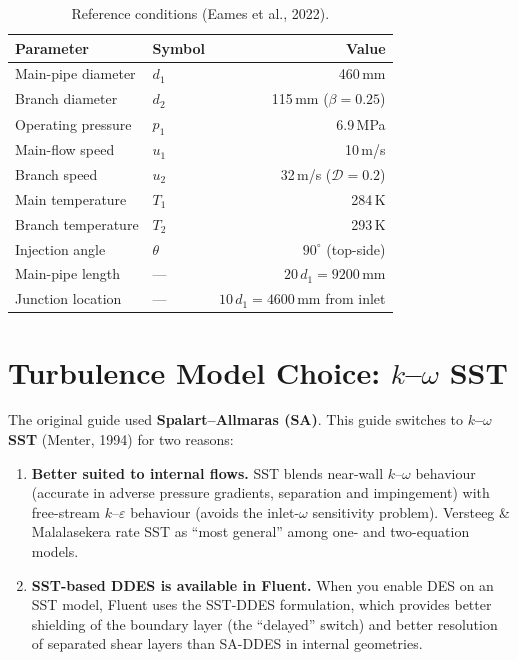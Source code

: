 \documentclass[12pt,a4paper]{report}
\begin{document}
\begin{table}[H]
\centering
\caption{Reference conditions (Eames et al., 2022).}
\label{tab:refcond}
\begin{tabular}{@{}llr@{}}
\toprule
\textbf{Parameter} & \textbf{Symbol} & \textbf{Value} \\
\midrule
Main-pipe diameter   & $d_1$           & 460\,mm \\
Branch diameter      & $d_2$           & 115\,mm ($\beta = 0.25$) \\
Operating pressure   & $p_1$           & 6.9\,MPa \\
Main-flow speed      & $u_1$           & 10\,m/s \\
Branch speed         & $u_2$           & 32\,m/s ($\mathcal{D} = 0.2$) \\
Main temperature     & $T_1$           & 284\,K \\
Branch temperature   & $T_2$           & 293\,K \\
Injection angle      & $\theta$        & $90^{\circ}$ (top-side) \\
Main-pipe length     & ---             & $20\,d_1 = 9200$\,mm \\
Junction location    & ---             & $10\,d_1 = 4600$\,mm from inlet \\
\bottomrule
\end{tabular}
\end{table}


\section{Turbulence Model Choice: $k$--$\omega$ SST}
\label{sec:whysst}

The original guide used \textbf{Spalart--Allmaras (SA)}.  This guide
switches to \textbf{$k$--$\omega$ SST} (Menter, 1994) for two
reasons:

\begin{enumerate}
  \item \textbf{Better suited to internal flows.}  SST blends near-wall
        $k$--$\omega$ behaviour (accurate in adverse pressure gradients,
        separation and impingement) with free-stream $k$--$\varepsilon$
        behaviour (avoids the inlet-$\omega$ sensitivity problem).
        Versteeg \& Malalasekera rate SST as ``most general'' among
        one- and two-equation models.
  \item \textbf{SST-based DDES is available in Fluent.}  When you
        enable DES on an SST model, Fluent uses the SST-DDES
        formulation, which provides better shielding of the boundary
        layer (the ``delayed'' switch) and better resolution of
        separated shear layers than SA-DDES in internal geometries.
\end{enumerate}
\end{document}
